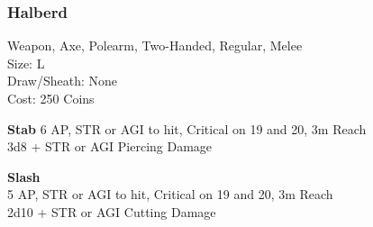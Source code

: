 \subsubsection{Halberd}\label{weapon:halberd}
Weapon, Axe, Polearm, Two-Handed, Regular, Melee\\
Size: L\\
Draw/Sheath: None\\
Cost: 250 Coins

\textbf{Stab}
6 AP, STR or AGI to hit, Critical on 19 and 20, 3m Reach\\
3d8 + \texttimes STR or AGI Piercing Damage

\textbf{Slash}\\
5 AP, STR or AGI to hit, Critical on 19 and 20, 3m Reach\\
2d10 + \texttimes STR or AGI Cutting Damage

